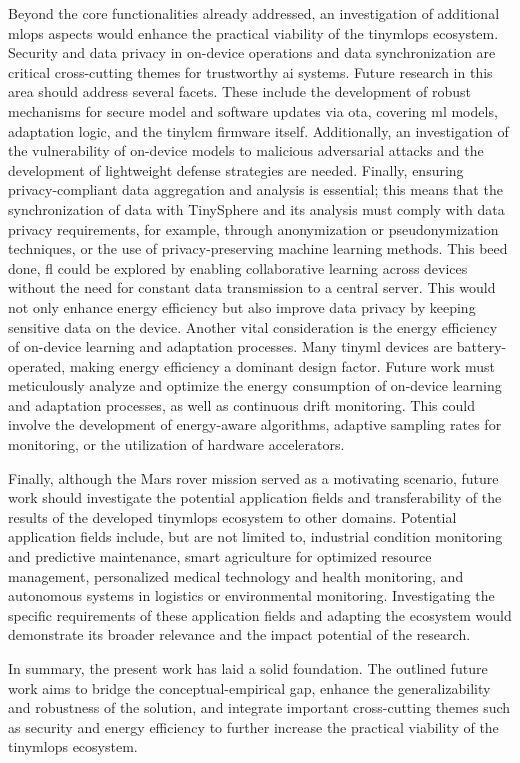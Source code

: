 Beyond the core functionalities already addressed, an investigation of additional \gls{mlops} aspects would enhance the practical viability of the \gls{tinymlops} ecosystem. Security and data privacy in on-device operations and data synchronization are critical cross-cutting themes for trustworthy \gls{ai} systems. Future research in this area should address several facets. These include the development of robust mechanisms for secure model and software updates via \gls{ota}, covering \gls{ml} models, adaptation logic, and the \gls{tinylcm} firmware itself. Additionally, an investigation of the vulnerability of on-device models to malicious adversarial attacks and the development of lightweight defense strategies are needed. Finally, ensuring privacy-compliant data aggregation and analysis is essential; this means that the synchronization of data with TinySphere and its analysis must comply with data privacy requirements, for example, through anonymization or pseudonymization techniques, or the use of privacy-preserving machine learning methods. This beed done, \gls{fl} could be explored by enabling collaborative learning across devices without the need for constant data transmission to a central server. This would not only enhance energy efficiency but also improve data privacy by keeping sensitive data on the device. Another vital consideration is the energy efficiency of on-device learning and adaptation processes. Many \gls{tinyml} devices are battery-operated, making energy efficiency a dominant design factor. Future work must meticulously analyze and optimize the energy consumption of on-device learning and adaptation processes, as well as continuous drift monitoring. This could involve the development of energy-aware algorithms, adaptive sampling rates for monitoring, or the utilization of hardware accelerators.

Finally, although the Mars rover mission served as a motivating scenario, future work should investigate the potential application fields and transferability of the results of the developed \gls{tinymlops} ecosystem to other domains. Potential application fields include, but are not limited to, industrial condition monitoring and predictive maintenance, smart agriculture for optimized resource management, personalized medical technology and health monitoring, and autonomous systems in logistics or environmental monitoring. Investigating the specific requirements of these application fields and adapting the ecosystem would demonstrate its broader relevance and the impact potential of the research.

In summary, the present work has laid a solid foundation. The outlined future work aims to bridge the conceptual-empirical gap, enhance the generalizability and robustness of the solution, and integrate important cross-cutting themes such as security and energy efficiency to further increase the practical viability of the \gls{tinymlops} ecosystem.
